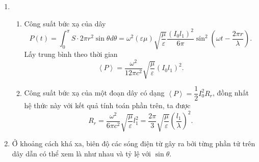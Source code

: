 \begin{enumerate}
\item 
\begin{enumerate}
    \item 
    Công suất bức xạ của dây
    \begin{equation} \label{eq1_far_field}
        P(t) = \int_0^\pi S \cdot 2 \pi r^2 \sin \theta d \theta = \omega^2 (\varepsilon \mu) \sqrt{ \dfrac{\mu}{\varepsilon} } \dfrac{(I_0 l_1)^2}{6 \pi} \sin^2 \left( \omega t - \dfrac{2 \pi r}{\lambda} \right).
    \end{equation}
    Lấy trung bình theo thời gian
    \begin{equation} \label{eq2_far_field}
        \left< P \right> = \dfrac{\omega^2}{12 \pi c^2} \sqrt{ \dfrac{\mu}{\varepsilon} } (I_0 l_1)^2.
    \end{equation}
    \item Công suất bức xạ của một đoạn dây có dạng $\left< P \right> = \dfrac{1}{2} I_0^2 R_r$, đồng nhất hệ thức này với kết quả tính toán phần trên, ta được
    \begin{equation} \label{eq3_far_field}
        R_r = \dfrac{\omega^2}{6 \pi c^2} \sqrt{\dfrac{\mu}{\varepsilon}} l_1^2 = \dfrac{2 \pi}{3} \sqrt{\dfrac{\mu}{\varepsilon}} \left( \dfrac{l_1}{\lambda} \right)^2.
        \end{equation}
    \end{enumerate}
\item Ở khoảng cách khá xa, biên độ các sóng điện từ gây ra bởi từng phần tử trên dây dẫn có thể xem là như nhau và tỷ lệ với $\sin \theta$.
\begin{center}
\begin{minipage}{0.4\textwidth}
\centering
{}
\end{minipage}
\hspace{0.1\textwidth}
\begin{minipage}{0.4\textwidth}

\end{minipage}
\end{center}
\end{enumerate}
